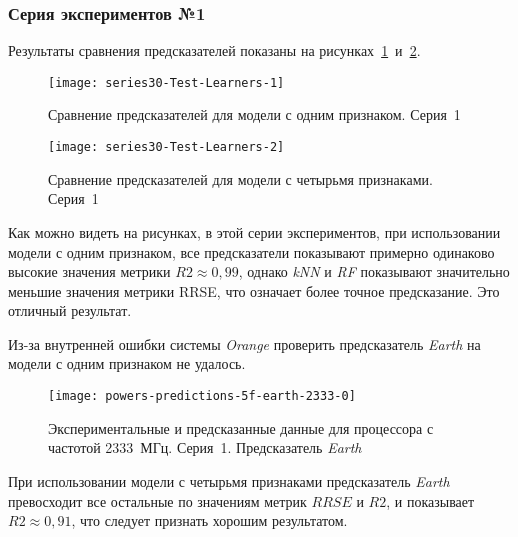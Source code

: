 \subsubsection{Серия экспериментов №1}

Результаты сравнения предсказателей показаны на рисунках~\ref{img:series30-Test-Learners-1}~и~\ref{img:series30-Test-Learners-2}.

\begin{figure}[H]
    \begin{center}
            \texttt{[image: series30-Test-Learners-1]}
            \caption{Сравнение предсказателей для модели с одним признаком. Серия~1} %
            \label{img:series30-Test-Learners-1} %
    \end{center}
\end{figure}

\begin{figure}[H]
    \begin{center}
            \texttt{[image: series30-Test-Learners-2]}
            \caption{Сравнение предсказателей для модели с четырьмя признаками. Серия~1}
            \label{img:series30-Test-Learners-2}
    \end{center}
\end{figure}

Как можно видеть на рисунках, в этой серии экспериментов, при использовании модели с одним признаком, все предсказатели показывают примерно одинаково высокие значения метрики $R2 \approx 0,99$, однако \textit{kNN} и \textit{RF} показывают значительно меньшие значения метрики RRSE, что означает более точное предсказание. Это отличный результат.

Из-за внутренней ошибки системы \textit{Orange} проверить предсказатель \textit{Earth} на модели с одним признаком не удалось.

\begin{figure}[H]
    \begin{center}
        \texttt{[image: powers-predictions-5f-earth-2333-0]}
        \caption{Экспериментальные и предсказанные данные для процессора с частотой 2333~МГц. Серия~1. Предсказатель \textit{Earth}}
        \label{img:powers-predictions-5f-earth-2333-0}
    \end{center}
\end{figure}

При использовании модели с четырьмя признаками предсказатель \textit{Earth} превосходит все остальные по значениям метрик $RRSE$ и $R2$, и показывает $R2 \approx 0,91$, что следует признать хорошим результатом.

